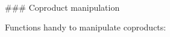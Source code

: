 \begin{code}%
\>[0]\AgdaOperator{\AgdaFunction{\AgdaUnderscore{}\$\AgdaUnderscore{}}}\<%
\\
\>[0][@{}l@{\AgdaIndent{0}}]%
\>[2]\AgdaSymbol{:}\AgdaSpace{}%
\AgdaSpace{}%
\AgdaSymbol{\{}\AgdaSpace{}%
\AgdaSymbol{:}\AgdaSpace{}%
\AgdaSpace{}%
\AgdaSymbol{\}}\AgdaSpace{}%
\AgdaSymbol{\{}\AgdaSpace{}%
\AgdaSymbol{:}\AgdaSpace{}%
\AgdaSpace{}%
\AgdaSpace{}%
\AgdaSpace{}%
\AgdaSymbol{\}}\<%
\\
%
\>[2]\AgdaSpace{}%
\AgdaSpace{}%
\AgdaSpace{}%
\AgdaSpace{}%
\AgdaSpace{}%
\AgdaSymbol{)}\<%
\\
%
\>[2]\AgdaComment{-------------}\<%
\\
%
\>[2]\AgdaSpace{}%
\AgdaSpace{}%
\AgdaSpace{}%
\AgdaSpace{}%
\AgdaSpace{}%
\AgdaSymbol{)}\<%
\\
%
\\[\AgdaEmptyExtraSkip]%
\>[0]\AgdaSpace{}%
\AgdaOperator{\AgdaFunction{\$}}\AgdaSpace{}%
\AgdaSpace{}%
\AgdaSymbol{=}\AgdaSpace{}%
\AgdaSpace{}%
\<%
\\
%
\\[\AgdaEmptyExtraSkip]%
\>[0]\AgdaSpace{}%
\AgdaSpace{}%
\AgdaOperator{\AgdaFunction{\AgdaUnderscore{}\$\AgdaUnderscore{}}}\<%
\end{code}

### Coproduct manipulation

Functions handy to manipulate coproducts:

